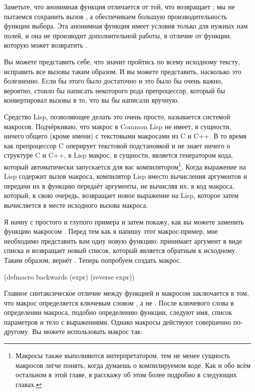 Заметьте, что анонимная функция отличается от той, что возвращает ; мы не
пытаемся сохранить вызов , а обеспечиваем большую производительность функции
выбора. Эта анонимная функция имеет условия только для нужных нам полей, и она не
производит дополнительной работы, в отличие от функции, которую может возвратить
.

Вы можете представить себе, что значит пройтись по всему исходному тексту, исправить все
вызовы  таким образом. И вы можете представить, насколько это болезненно. Если
бы этого было достаточно и это было бы очень важно, вероятно, стоило бы написать
некоторого рода препроцессор, который бы конвертировал вызовы  в то, что вы бы
написали вручную.

Средство Lisp, позволяющее делать это очень просто, называется системой
макросов. Подчёркиваю, что макрос в Common Lisp не имеет, в сущности, ничего общего (кроме
имени) с текстовыми макросами из C и C++. В то время как препроцессор C оперирует
текстовой подстановкой и не знает ничего о структуре C и C++, в Lisp макрос, в сущности,
является генератором кода, который автоматически запускается для вас
компилятором\footnote{Макросы также выполняются интерпретатором, тем не менее
  сущность макросов легче понять, когда думаешь о компилируемом коде. Как и обо всём
  остальном в этой главе, я расскажу об этом более подробно в следующих главах.}. Когда
выражение на Lisp содержит вызов макроса, компилятор Lisp вместо вычисления аргументов и
передачи их в функцию передаёт аргументы, не вычисляя их, в код макроса, который, в свою
очередь, возвращает новое выражение на Lisp, которое затем вычисляется в месте исходного
вызова макроса.

Я начну с простого и глупого примера и затем покажу, как вы можете заменить функцию
 макросом . Перед тем как я напишу этот макрос-пример, мне
необходимо представить вам одну новую функцию:  принимает аргумент в виде
списка и возвращает новый список, который является обратным к исходному. Таким образом,
 вернёт . Теперь попробуем создать макрос.

\begin{myverb}
(defmacro backwards (expr)
  (reverse expr))
\end{myverb}

Главное синтаксическое отличие между функцией и макросом заключается в том, что макрос
определяется ключевым словом , а не . После ключевого слова в
определении макроса, подобно определению функции, следуют имя, список параметров и тело с
выражениями. Однако макросы действуют совершенно по-другому. Вы можете использовать макрос
так:

